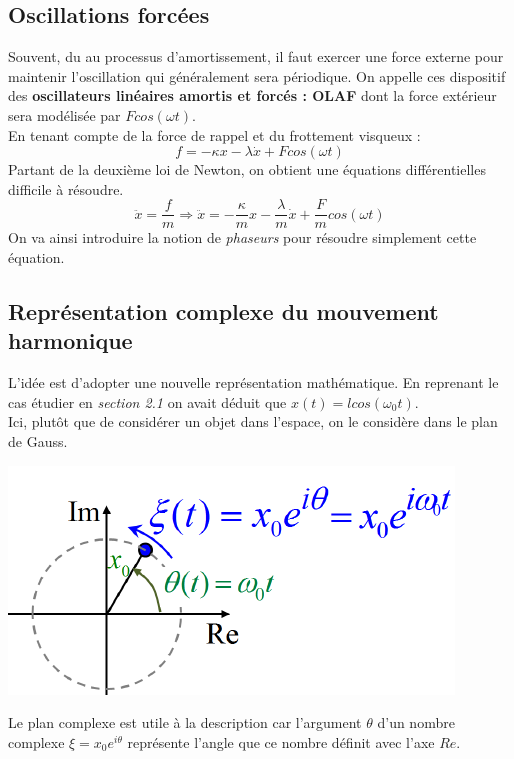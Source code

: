 \documentclass	[11pt, a4paper, openany]{book}
\begin{document}
	\subsection{Oscillations forcées}
	Souvent, du au processus d'amortissement, il faut exercer une force externe pour maintenir l'oscillation qui généralement sera périodique. On appelle ces dispositif des \textbf{oscillateurs linéaires amortis et forcés : OLAF} dont la force extérieur sera modélisée par $Fcos(\omega t)$.\\
	En tenant compte de la force de rappel et du frottement visqueux :
	\begin{equation}
		f = -\kappa x - \lambda \dot{x} + Fcos(\omega t)
	\end{equation}
	Partant de la deuxième loi de Newton, on obtient une équations différentielles difficile à résoudre.
	\begin{equation}
		\ddot{x} = \frac{f}{m} \Rightarrow \ddot{x} = -\frac{\kappa}{m}x - \frac{\lambda}{m}\dot{x} + \frac{F}{m}cos(\omega t)
	\end{equation}
	On va ainsi introduire la notion de \textit{phaseurs} pour résoudre simplement cette équation.
	
	\subsection{Représentation complexe du mouvement harmonique}
	L'idée est d'adopter une nouvelle représentation mathématique. En reprenant le cas étudier en \textit{section 2.1} on avait déduit que $x(t) = lcos(\omega_0 t)$.\\
	Ici, plutôt que de considérer un objet dans l'espace, on le considère dans le plan de Gauss.
	
	\begin{center}
		\includegraphics[scale=0.45]{oo/image11.png}
	\end{center}
	Le plan complexe est utile à la description car l'argument $\theta$ d'un nombre complexe $\xi = x_0e^{i\theta}$ représente l'angle que ce nombre définit avec l'axe $Re$.\\
	
\end{document}
